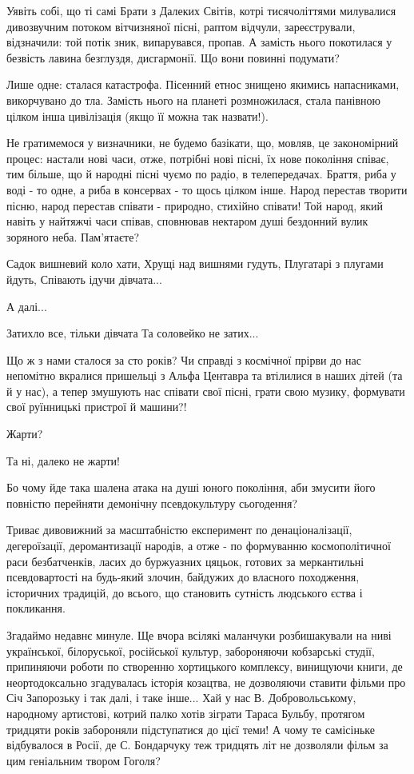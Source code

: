 Уявіть собі, що ті самі Брати з Далеких Світів, котрі тисячоліттями милувалися
дивозвучним потоком вітчизняної пісні, раптом відчули, зареєстрували,
відзначили: той потік зник, випарувався, пропав. А замість нього покотилася у
безвість лавина безглуздя, дисгармонії. Що вони повинні подумати?

Лише одне: сталася катастрофа. Пісенний етнос знищено якимись напасниками,
викорчувано до тла. Замість нього на планеті розмножилася, стала панівною
цілком інша цивілізація (якщо її можна так назвати!).

Не гратимемося у визначники, не будемо базікати, що, мовляв, це закономірний
процес: настали нові часи, отже, потрібні нові пісні, їх нове покоління співає,
тим більше, що й народні пісні чуємо по радіо, в телепередачах. Браття, риба у
воді - то одне, а риба в консервах - то щось цілком інше. Народ перестав
творити пісню, народ перестав співати - природно, стихійно співати! Той народ,
який навіть у найтяжчі часи співав, сповнював нектаром душі бездонний вулик
зоряного неба. Пам'ятаєте?

Садок вишневий коло хати,
Хрущі над вишнями гудуть,
Плугатарі з плугами йдуть,
Співають ідучи дівчата...

А далі...

Затихло все, тільки дівчата
Та соловейко не затих...

Що ж з нами сталося за сто років? Чи справді з космічної прірви до нас
непомітно вкралися пришельці з Альфа Центавра та втілилися в наших дітей (та й
у нас), а тепер змушують нас співати свої пісні, грати свою музику, формувати
свої руїнницькі пристрої й машини?!

Жарти?

Та ні, далеко не жарти!

Бо чому йде така шалена атака на душі юного покоління, аби змусити його
повністю перейняти демонічну псевдокультуру сьогодення?

Триває дивовижний за масштабністю експеримент по денаціоналізації, дегероїзації, деромантизації народів, а отже - по формуванню космополітичної раси безбатченків, ласих до буржуазних цяцьок, готових за меркантильні псевдовартості на будь-який злочин, байдужих до власного походження, історичних традицій, до всього, що становить сутність людського єства і покликання.

Згадаймо недавнє минуле. Ще вчора всілякі маланчуки розбишакували на ниві
української, білоруської, російської культур, забороняючи кобзарські студії,
припиняючи роботи по створенню хортицького комплексу, винищуючи книги, де
неортодоксально згадувалась історія козацтва, не дозволяючи ставити фільми про
Січ Запорозьку і так далі, і таке інше... Хай у нас В. Добровольському,
народному артистові, котрий палко хотів зіграти Тараса Бульбу, протягом
тридцяти років забороняли підступатися до цієї теми! А чому те самісіньке
відбувалося в Росії, де С. Бондарчуку теж тридцять літ не дозволяли фільм за
цим геніальним твором Гоголя?

